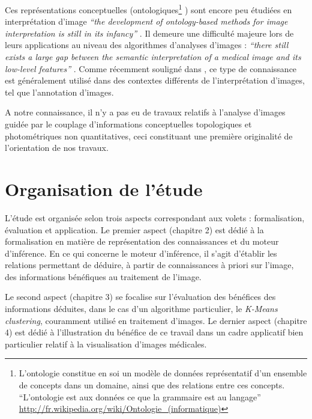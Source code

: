 	Ces représentations conceptuelles (ontologiques\footnote{L'ontologie constitue en soi un modèle de données représentatif d'un ensemble de concepts dans un domaine, ainsi que des relations entre ces concepts. ``L'ontologie est aux données ce que la grammaire est au langage'' \url{http://fr.wikipedia.org/wiki/Ontologie_(informatique)}} \citep[Atif]{Atif2007}) sont encore peu étudiées en interprétation d'image \textit{``the development of ontology-based methods for image interpretation is still in its infancy''} \citep[Hudelot, p.1929]{Hudelot2008}. Il demeure une difficulté majeure lors de leurs applications au niveau des algorithmes d'analyses d'images : \textit{``there still exists a large gap between the semantic interpretation of a medical image and its low-level features'' } \citep[Deruyver, p.1245]{deruyver2009}. Comme récemment souligné dans \citep[Hudelot]{Hudelot2008}, ce type de connaissance est généralement utilisé dans des contextes différents de l'interprétation d'images, tel que l'annotation d'images. 

	A notre connaissance, il n'y a pas eu de travaux relatifs à l'analyse d'images guidée par le couplage d'informations conceptuelles topologiques et photométriques non quantitatives, ceci constituant une première originalité de l'orientation de nos travaux.


	\section{Organisation de l'étude}

	L'étude est organisée selon trois aspects correspondant aux volets : formalisation, évaluation et application. 
Le premier aspect (chapitre 2) est dédié à la formalisation en matière de représentation des connaissances et du moteur d'inférence. En ce qui concerne le moteur d'inférence, il s'agit d'établir les relations permettant de déduire, à partir de connaissances à priori sur l'image, des informations bénéfiques au traitement de l'image. 

Le second aspect (chapitre 3) se focalise sur l'évaluation des bénéfices des informations déduites, dans le cas d'un algorithme particulier, le {\it K-Means clustering}, couramment utilisé en traitement d'images.
Le dernier aspect (chapitre 4) est dédié à l'illustration du bénéfice de ce travail dans un cadre applicatif bien particulier relatif à la visualisation d'images médicales.



